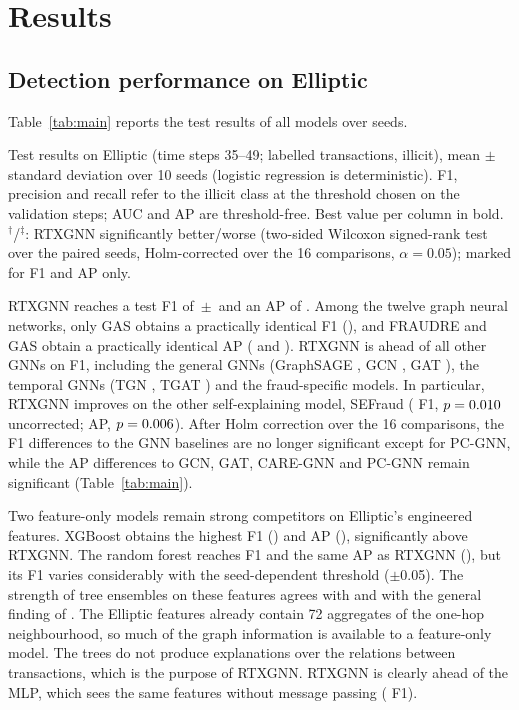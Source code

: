 \section{Results}
\label{sec:experiments}

\subsection{Detection performance on Elliptic}
\label{subsec:main}

Table~\ref{tab:main} reports the test results of all models over \nSeedsMain{} seeds.

\begin{table}[!t]
\centering
\caption{Test results on Elliptic (time steps 35--49; \nTest{} labelled transactions, \nTestIllicit{} illicit), mean $\pm$ standard deviation over 10 seeds (logistic regression is deterministic). F1, precision and recall refer to the illicit class at the threshold chosen on the validation steps; AUC and AP are threshold-free. Best value per column in bold. $^{\dagger}$/$^{\ddagger}$: RTXGNN significantly better/worse (two-sided Wilcoxon signed-rank test over the paired seeds, Holm-corrected over the 16 comparisons, $\alpha=0.05$); marked for F1 and AP only.}
\label{tab:main}
\footnotesize
\setlength{\tabcolsep}{4pt}
\begin{adjustbox}{max width=\textwidth}\end{adjustbox}
\end{table}

RTXGNN reaches a test F1 of \rtxFone{}\,$\pm$\,\rtxFoneSd{} and an AP of \rtxAP{}. Among the twelve graph neural networks, only GAS obtains a practically identical F1 (\gasFone), and FRAUDRE and GAS obtain a practically identical AP (\fraudreAP{} and \gasAP). RTXGNN is ahead of all other GNNs on F1, including the general GNNs (GraphSAGE \sageFone, GCN \gcnFone, GAT \gatFone), the temporal GNNs (TGN \tgnFone, TGAT \tgatFone) and the fraud-specific models. In particular, RTXGNN improves on the other self-explaining model, SEFraud (\deltaFOnesefraud{} F1, $p=0.010$ uncorrected; \deltaAPsefraud{} AP, $p=0.006$). After Holm correction over the 16 comparisons, the F1 differences to the GNN baselines are no longer significant except for PC-GNN, while the AP differences to GCN, GAT, CARE-GNN and PC-GNN remain significant (Table~\ref{tab:main}).

Two feature-only models remain strong competitors on Elliptic's engineered features. XGBoost obtains the highest F1 (\xgbFone) and AP (\xgbAP), significantly above RTXGNN. The random forest reaches F1 \rfFone{} and the same AP as RTXGNN (\rfAP), but its F1 varies considerably with the seed-dependent threshold ($\pm$0.05). The strength of tree ensembles on these features agrees with \citet{weber2019anti} and with the general finding of \citet{grinsztajn2022tree}. The Elliptic features already contain 72 aggregates of the one-hop neighbourhood, so much of the graph information is available to a feature-only model. The trees do not produce explanations over the relations between transactions, which is the purpose of RTXGNN. RTXGNN is clearly ahead of the MLP, which sees the same features without message passing (\deltaFOnemlp{} F1).

